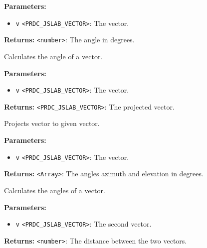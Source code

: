 \documentclass[12pt,a4paper]{article}
\begin{document}
\noindent \textbf{Parameters:}
\begin{itemize}
  \item \texttt{v} \texttt{<PRDC\_JSLAB\_VECTOR>}: The vector.
\end{itemize}

\noindent \textbf{Returns:} \texttt{<number>}: The angle in degrees.

\noindent Calculates the angle of a vector.

\vspace{5mm}
\noindent {}


\noindent \textbf{Parameters:}
\begin{itemize}
  \item \texttt{v} \texttt{<PRDC\_JSLAB\_VECTOR>}: The vector.
\end{itemize}

\noindent \textbf{Returns:} \texttt{<PRDC\_JSLAB\_VECTOR>}: The projected vector.

\noindent Projects vector to given vector.

\vspace{5mm}
\noindent {}


\noindent \textbf{Parameters:}
\begin{itemize}
  \item \texttt{v} \texttt{<PRDC\_JSLAB\_VECTOR>}: The vector.
\end{itemize}

\noindent \textbf{Returns:} \texttt{<Array>}: The angles azimuth and elevation in degrees.

\noindent Calculates the angles of a vector.

\vspace{5mm}
\noindent {}


\noindent \textbf{Parameters:}
\begin{itemize}
  \item \texttt{v} \texttt{<PRDC\_JSLAB\_VECTOR>}: The second vector.
\end{itemize}

\noindent \textbf{Returns:} \texttt{<number>}: The distance between the two vectors.
\end{document}
